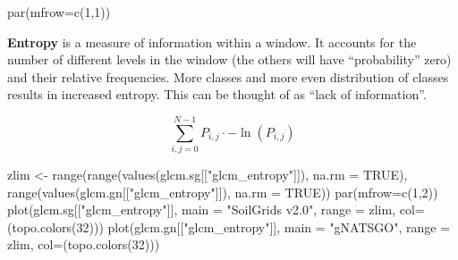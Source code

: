 \documentclass[
  letterpaper,
  DIV=11,
  numbers=noendperiod]{scrartcl}
\newenvironment{Shaded}{\begin{snugshade}}{\end{snugshade}}
\newcommand{\AttributeTok}[1]{\textcolor[rgb]{0.40,0.45,0.13}{#1}}
\newcommand{\ConstantTok}[1]{\textcolor[rgb]{0.56,0.35,0.01}{#1}}
\newcommand{\DecValTok}[1]{\textcolor[rgb]{0.68,0.00,0.00}{#1}}
\newcommand{\FunctionTok}[1]{\textcolor[rgb]{0.28,0.35,0.67}{#1}}
\newcommand{\NormalTok}[1]{\textcolor[rgb]{0.00,0.23,0.31}{#1}}
\newcommand{\OtherTok}[1]{\textcolor[rgb]{0.00,0.23,0.31}{#1}}
\newcommand{\StringTok}[1]{\textcolor[rgb]{0.13,0.47,0.30}{#1}}
\begin{document}
\begin{Shaded}
\begin{Highlighting}[]
\FunctionTok{par}\NormalTok{(}\AttributeTok{mfrow=}\FunctionTok{c}\NormalTok{(}\DecValTok{1}\NormalTok{,}\DecValTok{1}\NormalTok{))}
\end{Highlighting}
\end{Shaded}

\textbf{Entropy} is a measure of information within a window. It
accounts for the number of different levels in the window (the others
will have ``probability'' zero) and their relative frequencies. More
classes and more even distribution of classes results in increased
entropy. This can be thought of as ``lack of information''.

\[\sum_{i,j = 0}^{N-1} P_{i,j}\cdot -\ln(P_{i,j})\]

\begin{Shaded}
\begin{Highlighting}[]
\NormalTok{zlim }\OtherTok{\textless{}{-}} \FunctionTok{range}\NormalTok{(}\FunctionTok{range}\NormalTok{(}\FunctionTok{values}\NormalTok{(glcm.sg[[}\StringTok{"glcm\_entropy"}\NormalTok{]]), }\AttributeTok{na.rm =} \ConstantTok{TRUE}\NormalTok{), }
                     \FunctionTok{range}\NormalTok{(}\FunctionTok{values}\NormalTok{(glcm.gn[[}\StringTok{"glcm\_entropy"}\NormalTok{]]), }\AttributeTok{na.rm =} \ConstantTok{TRUE}\NormalTok{))}
\FunctionTok{par}\NormalTok{(}\AttributeTok{mfrow=}\FunctionTok{c}\NormalTok{(}\DecValTok{1}\NormalTok{,}\DecValTok{2}\NormalTok{))}
\FunctionTok{plot}\NormalTok{(glcm.sg[[}\StringTok{"glcm\_entropy"}\NormalTok{]], }\AttributeTok{main =} \StringTok{"SoilGrids v2.0"}\NormalTok{, }
     \AttributeTok{range =}\NormalTok{ zlim, }\AttributeTok{col=}\NormalTok{(}\FunctionTok{topo.colors}\NormalTok{(}\DecValTok{32}\NormalTok{)))}
\FunctionTok{plot}\NormalTok{(glcm.gn[[}\StringTok{"glcm\_entropy"}\NormalTok{]], }\AttributeTok{main =} \StringTok{"gNATSGO"}\NormalTok{, }
     \AttributeTok{range =}\NormalTok{ zlim, }\AttributeTok{col=}\NormalTok{(}\FunctionTok{topo.colors}\NormalTok{(}\DecValTok{32}\NormalTok{)))}
\end{Highlighting}
\end{Shaded}
\end{document}
